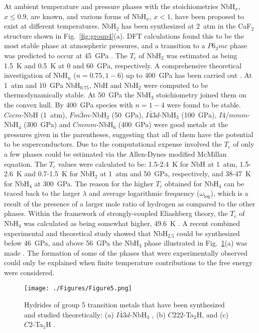 \documentclass[12pt,letterpaper,oneside]{article}
\begin{document}
At ambient temperature and pressure phases with the stoichiometries NbH$_x$, $x\le0.9$, are known, and various forms of NbH$_x$, $x<1$, have been proposed to exist at different temperatures. NbH$_2$ has been synthesized at 2~atm in the CaF$_2$ structure shown in Fig.\ \ref{fig:group4}(a). DFT calculations found this to be the most stable phase at atmospheric pressures, and a transition to a $P6_3mc$ phase was predicted to occur at 45~GPa \cite{Chen:2014}. The $T_c$ of NbH$_2$ was estimated as being 1.5~K and 0.5~K at 0 and 60~GPa, respectively. A comprehensive theoretical investigation of NbH$_n$ ($n=0.75, 1-6$) up to 400~GPa has been carried out \cite{Gao:2013a}. At 1~atm and 10~GPa NbH$_{0.75}$, NbH and NbH$_2$ were computed to be thermodynamically stable. At 50~GPa the NbH$_3$ stoichiometry joined them on the convex hull. By 400~GPa species with $n=1-4$ were found to be stable. $Cccm$-NbH (1~atm), $Fm\bar{3}m$-NbH$_2$ (50~GPa), $I\bar{4}3d$-NbH$_3$ (100~GPa), $I4/mmm$-NbH$_4$ (300~GPa) and $Cmmm$-NbH$_6$ (400~GPa) were good metals at the pressures given in the parentheses, suggesting that all of them have the potential to be superconductors. Due to the computational expense involved the $T_c$ of only a few phases could be estimated via the Allen-Dynes modified McMillan equation. The $T_c$ values were calculated to be: 1.5-2.4~K for NbH at 1~atm, 1.5-2.6~K and 0.7-1.5~K for NbH$_2$ at 1~atm and 50~GPa, respectively, and 38-47~K for NbH$_4$ at 300~GPa. The reason for the higher $T_c$ obtained for NbH$_4$ can be traced back to the larger $\lambda$ and average logarithmic frequency ($\omega_\text{log}$), which is a result of the presence of a larger mole ratio of hydrogen as compared to the other phases. Within the framework of strongly-coupled Eliashberg theory, the $T_c$ of NbH$_4$ was calculated as being somewhat higher, 49.6~K \cite{Durajski:2014b}. A recent combined experimental and theoretical study showed that NbH$_{2.5}$ could be synthesized below 46~GPa, and above 56~GPa the NbH$_3$ phase illustrated in Fig.\ \ref{fig:group5}(a) was made \cite{Liu:2017}. The formation of some of the phases that were experimentally observed could only be explained when finite temperature contributions to the free energy were considered.
%
\begin{figure}[h!]
\begin{center}
\texttt{[image: ./Figures/Figure5.png]}
\end{center}
\caption{Hydrides of group 5 transition metals that have been synthesized and studied theoretically: (a) $I\bar{4}3d$-NbH$_3$ \cite{Gao:2013a,Liu:2017}, (b) $C222$-Ta$_2$H, and (c) $C2$-Ta$_5$H \cite{Zhuang:2017a}.}
\label{fig:group5}
\end{figure}
\end{document}
